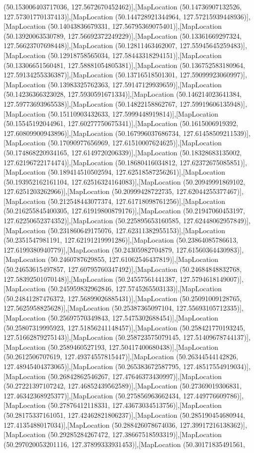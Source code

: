(50.153006403717036, 127.5672670452462)],[MapLocation (50.14736907132526, 127.57301770137413)],[MapLocation (50.144728921344964, 127.57215939448936)],[MapLocation (50.14043836679331, 127.56795369075401)],[MapLocation (50.13920063530789, 127.56692372249229)],[MapLocation (50.13361669297324, 127.56623707698448)],[MapLocation (50.12811463462007, 127.55945645259483)],[MapLocation (50.12918758565034, 127.58443318294151)],[MapLocation (50.13306651560481, 127.58881054805381)],[MapLocation (50.136752583180964, 127.59134255336387)],[MapLocation (50.13716518501301, 127.59099923060997)],[MapLocation (50.13983325762363, 127.59147129939659)],[MapLocation (50.14236366323028, 127.5930591671334)],[MapLocation (50.146214023641384, 127.59773693965538)],[MapLocation (50.14822158862767, 127.59919606135948)],[MapLocation (50.15110903432633, 127.5999448919814)],[MapLocation (50.15545192044961, 127.60277750675341)],[MapLocation (50.1615006919392, 127.60809900943896)],[MapLocation (50.167996037686734, 127.61458509211539)],[MapLocation (50.17090977656969, 127.61510007624625)],[MapLocation (50.174868220934165, 127.6149720206339)],[MapLocation (50.18328683135002, 127.62196722174474)],[MapLocation (50.18680416034812, 127.62372675085851)],[MapLocation (50.189414510502594, 127.62518587256261)],[MapLocation (50.193952162161104, 127.62516324164083)],[MapLocation (50.20949991869102, 127.6251203262966)],[MapLocation (50.20999428722735, 127.62044255377467)],[MapLocation (50.212548443077374, 127.61718098761256)],[MapLocation (50.216255845400305, 127.61919800879176)],[MapLocation (50.21947060453197, 127.62250652374352)],[MapLocation (50.225895653160585, 127.62448062957849)],[MapLocation (50.231860649175076, 127.62311382955153)],[MapLocation (50.2351547981191, 127.62191219991286)],[MapLocation (50.23864085786613, 127.6199380940779)],[MapLocation (50.24305982704879, 127.61560364430983)],[MapLocation (50.2460787629855, 127.61062546437819)],[MapLocation (50.24653615497857, 127.60795760347492)],[MapLocation (50.24684848832768, 127.58392501070148)],[MapLocation (50.24557561441387, 127.5794618149007)],[MapLocation (50.245959832962846, 127.5745265503133)],[MapLocation (50.24841287476372, 127.56899026885431)],[MapLocation (50.25091009128765, 127.5625958825628)],[MapLocation (50.25387365097104, 127.55693105712335)],[MapLocation (50.25697570349843, 127.5475302688454)],[MapLocation (50.25807319995923, 127.51856241148457)],[MapLocation (50.258421770193245, 127.51662879275143)],[MapLocation (50.258723575079145, 127.51409678744137)],[MapLocation (50.2589460527193, 127.50417400680438)],[MapLocation (50.2612506707619, 127.49374557815447)],[MapLocation (50.26344544142826, 127.48945404373065)],[MapLocation (50.265383672587795, 127.48517554919034)],[MapLocation (50.26842862546267, 127.47646373430997)],[MapLocation (50.27221397107242, 127.46852439562589)],[MapLocation (50.27369019306831, 127.46342368925377)],[MapLocation (50.275856963662434, 127.449776609786)],[MapLocation (50.27876412118331, 127.43673034513756)],[MapLocation (50.28175337161051, 127.42462821806237)],[MapLocation (50.285190454680944, 127.4135488017034)],[MapLocation (50.288426078674036, 127.39917216138362)],[MapLocation (50.29285284267472, 127.38667518593319)],[MapLocation (50.297020053201116, 127.37899333931453)],[MapLocation (50.30171835491561, 